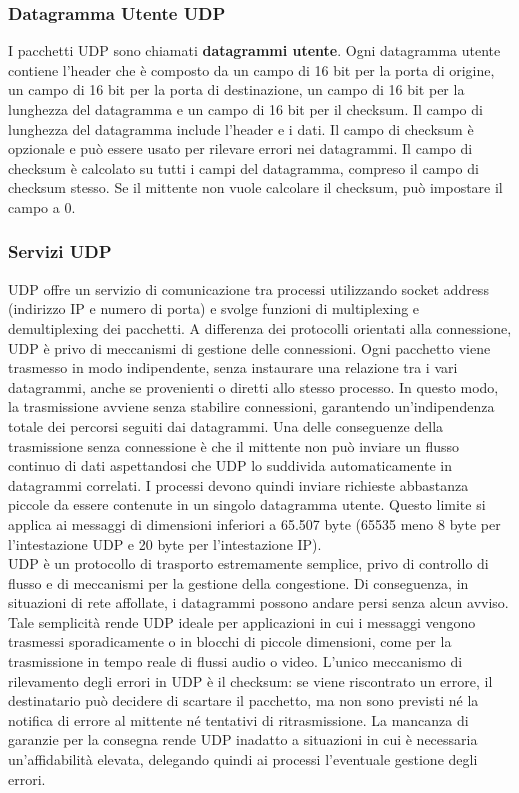 \documentclass[12pt]{report}
\begin{document}
	\subsubsection{Datagramma Utente UDP}
	I pacchetti UDP sono chiamati \textbf{datagrammi utente}. Ogni datagramma utente contiene l'header che è composto da un campo di 16 bit per la porta di origine, un campo di 16 bit per la porta di destinazione, un campo di 16 bit per la lunghezza del datagramma e un campo di 16 bit per il checksum. Il campo di lunghezza del datagramma include l'header e i dati. Il campo di checksum è opzionale e può essere usato per rilevare errori nei datagrammi. Il campo di checksum è calcolato su tutti i campi del datagramma, compreso il campo di checksum stesso. Se il mittente non vuole calcolare il checksum, può impostare il campo a 0.

	\subsubsection{Servizi UDP}
	UDP offre un servizio di comunicazione tra processi utilizzando socket address (indirizzo IP e numero di porta) e svolge funzioni di multiplexing e demultiplexing dei pacchetti. A differenza dei protocolli orientati alla connessione, UDP è privo di meccanismi di gestione delle connessioni. Ogni pacchetto viene trasmesso in modo indipendente, senza instaurare una relazione tra i vari datagrammi, anche se provenienti o diretti allo stesso processo. In questo modo, la trasmissione avviene senza stabilire connessioni, garantendo un’indipendenza totale dei percorsi seguiti dai datagrammi. Una delle conseguenze della trasmissione senza connessione è che il mittente non può inviare un flusso continuo di dati aspettandosi che UDP lo suddivida automaticamente in datagrammi correlati. I processi devono quindi inviare richieste abbastanza piccole da essere contenute in un singolo datagramma utente. Questo limite si applica ai messaggi di dimensioni inferiori a 65.507 byte (65535 meno 8 byte per l’intestazione UDP e 20 byte per l’intestazione IP).
	\vspace{\baselineskip}\\
	UDP è un protocollo di trasporto estremamente semplice, privo di controllo di flusso e di meccanismi per la gestione della congestione. Di conseguenza, in situazioni di rete affollate, i datagrammi possono andare persi senza alcun avviso. Tale semplicità rende UDP ideale per applicazioni in cui i messaggi vengono trasmessi sporadicamente o in blocchi di piccole dimensioni, come per la trasmissione in tempo reale di flussi audio o video. L’unico meccanismo di rilevamento degli errori in UDP è il checksum: se viene riscontrato un errore, il destinatario può decidere di scartare il pacchetto, ma non sono previsti né la notifica di errore al mittente né tentativi di ritrasmissione. La mancanza di garanzie per la consegna rende UDP inadatto a situazioni in cui è necessaria un'affidabilità elevata, delegando quindi ai processi l'eventuale gestione degli errori.
\end{document}
